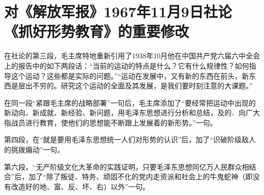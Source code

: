 \section[对《解放军报》1967年11月9日社论《抓好形势教育》的重要修改（一九六七年十一月）]{对《解放军报》1967年11月9日社论《抓好形势教育》的重要修改}


在社论的第三段，毛主席特地重新引用了1938年10月他在中国共产党六届六中全会上的报告中的如下两段话：“当前的运动的特点是什么？它有什么规律性？如何指导这个运动？这些都是实际的问题。”“运动在发展中，又有新的东西在前头，新东西是层出不穷的。研究这个运动的全面及其发展，是我们要时刻注意的大课题。”


在同一段“紧跟毛主席的战略部署”一句后，毛主席添加了“要经常把运动中出现的新动向、新成就、新经验、新问题，用毛泽东思想进行分析和总结，及的．向广大指战员进行教育，使他们的思想能不断跟上发展着的新形势。”一句。

第四段，在“就是要用毛泽东思想统一人们对形势的认识”后，加了“识破阶级敌人的挑拨煽动”一句。

第六段，“无产阶级文化大革命的实践证明，只要毛泽东思想同亿万人民群众相结合”后，加了“除了叛徒、特务、顽固不化的党内走资派和社会上的牛鬼蛇神（即没有改造好的地、富、反、坏、右）以外”一句。

